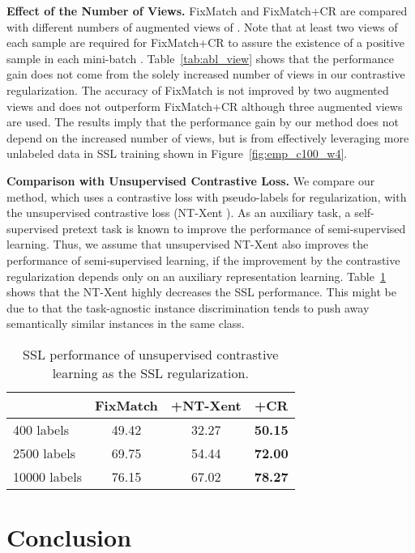 \documentclass[letterpaper]{article} \usepackage{aaai22}  \usepackage{times}  \usepackage{helvet}  \usepackage{courier}  \usepackage[hyphens]{url}  \usepackage{graphicx} \urlstyle{rm} \def\UrlFont{\rm}  \usepackage{natbib}  \usepackage{caption} \DeclareCaptionStyle{ruled}{labelfont=normalfont,labelsep=colon,strut=off} \frenchspacing  \setlength{\pdfpagewidth}{8.5in}  \setlength{\pdfpageheight}{11in}  \usepackage{algorithm}
\begin{document}
\textbf{Effect of the Number of Views.} \label{sec:num_views} 
FixMatch and FixMatch+CR are compared with different numbers of augmented views  of .
Note that at least two views of each sample are required for FixMatch+CR to assure the existence of a positive sample in each mini-batch \cite{chen2020simple}.
Table~\ref{tab:abl_view} shows that the performance gain does not come from the solely increased number of views in our contrastive regularization.
The accuracy of FixMatch is not improved by two augmented views and does not outperform FixMatch+CR although three augmented views are used.
The results imply that the performance gain by our method does not depend on the increased number of views, but is from effectively leveraging more unlabeled data in SSL training shown in Figure~\ref{fig:emp_c100_w4}.

\textbf{Comparison with Unsupervised Contrastive Loss.}
We compare our method, which uses a contrastive loss with pseudo-labels for regularization, with the unsupervised contrastive loss (NT-Xent \cite{chen2020simple}).
As an auxiliary task, a self-supervised pretext task is known to improve the performance of semi-supervised learning.
Thus, we assume that unsupervised NT-Xent also improves the performance of semi-supervised learning, if the improvement by the contrastive regularization depends only on an auxiliary representation learning.
Table~\ref{tab:nt-xent} shows that the NT-Xent highly decreases the SSL performance. 
This might be due to that the task-agnostic instance discrimination tends to push away semantically similar instances in the same class.

\begin{table} \centering
\footnotesize
\caption{SSL performance of unsupervised contrastive learning as the SSL regularization.}
\label{tab:nt-xent}
\begin{tabular}{l|ccc}
\toprule
  & FixMatch & +NT-Xent & +CR \\ \hline
400 labels & 49.42 & 32.27 & \textbf{50.15} \\
2500 labels & 69.75&  54.44 & \textbf{72.00} \\
10000 labels & 76.15&  67.02 & \textbf{78.27} \\
\bottomrule
\end{tabular}
\vspace{-0.05in}
\end{table}

\section{Conclusion} \label{sec:conclusion}
\end{document}
